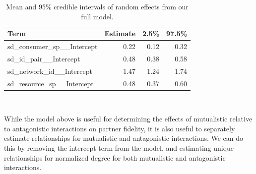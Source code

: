 \documentclass[11pt,]{article}
\begin{document}
\begin{table}[!h]

\caption{\label{tab:full-table-random}Mean and 95\% credible intervals of random effects from our full model.}
\centering
\begin{tabular}{lrrr}
\toprule
Term & Estimate & 2.5\% & 97.5\%\\
\midrule
\rowcolor{gray!6}  sd\_consumer\_sp\_\_Intercept & 0.22 & 0.12 & 0.32\\
sd\_id\_pair\_\_Intercept & 0.48 & 0.38 & 0.58\\
\rowcolor{gray!6}  sd\_network\_id\_\_Intercept & 1.47 & 1.24 & 1.74\\
sd\_resource\_sp\_\_Intercept & 0.48 & 0.37 & 0.60\\
\bottomrule
\end{tabular}
\end{table}

~

While the model above is useful for determining the effects of
mutualistic relative to antagonistic interactions on partner fidelity,
it is also useful to separately estimate relationships for mutualistic
and antagonistic interactions. We can do this by removing the intercept
term from the model, and estimating unique relationships for normalized
degree for both mutualistic and antagonistic interactions.
\end{document}
